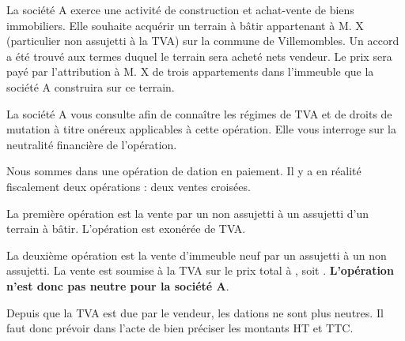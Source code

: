		\begin{enonce}
			La société A exerce une activité de construction et achat-vente de biens immobiliers. Elle souhaite acquérir un terrain à bâtir appartenant à M. X (particulier non assujetti à la TVA) sur la commune de Villemombles. Un accord a été trouvé aux termes duquel le terrain sera acheté  nets vendeur. Le prix sera payé par l’attribution à M. X de trois appartements dans l’immeuble que la société A construira sur ce terrain.

			
			La société A vous consulte afin de connaître les régimes de TVA et de droits de mutation à titre onéreux applicables à cette opération. Elle vous interroge sur la neutralité financière de l’opération.

		\end{enonce}
	
		Nous sommes dans une opération de dation en paiement. Il y a en réalité fiscalement deux opérations : deux ventes croisées.
		
		La première opération est la vente par un non assujetti à un assujetti d'un terrain à bâtir. L'opération est exonérée de TVA.
		
		La deuxième opération est la vente d'immeuble neuf par un assujetti à un non assujetti. La vente est soumise à la TVA sur le prix total à , soit . \textbf{L'opération n'est donc pas neutre pour la société A}.
		
		Depuis que la TVA est due par le vendeur, les dations ne sont plus neutres. Il faut donc prévoir dans l'acte de bien préciser les montants HT et TTC.
		
		